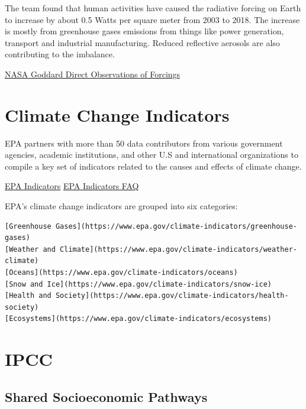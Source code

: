 \documentclass[
]{book}
\begin{document}
The team found that human activities have caused the radiative forcing on Earth to increase by about 0.5 Watts per square meter from 2003 to 2018. The increase is mostly from greenhouse gases emissions from things like power generation, transport and industrial manufacturing. Reduced reflective aerosols are also contributing to the imbalance.

\href{https://www.nasa.gov/feature/goddard/2021/direct-observations-confirm-that-humans-are-throwing-earth-s-energy-budget-off-balance}{NASA Goddard Direct Observations of Forcings}

\hypertarget{climate-change-indicators}{%
\chapter{Climate Change Indicators}\label{climate-change-indicators}}

EPA partners with more than 50 data contributors from various government agencies, academic institutions, and other U.S and international organizations to compile a key set of indicators related to the causes and effects of climate change.

\href{https://www.epa.gov/climate-indicators}{EPA Indicators}
\href{https://www.epa.gov/climate-indicators/frequent-questions-about-climate-change-indicators}{EPA Indicators FAQ}

EPA's climate change indicators are grouped into six categories:

\begin{verbatim}
[Greenhouse Gases](https://www.epa.gov/climate-indicators/greenhouse-gases)
[Weather and Climate](https://www.epa.gov/climate-indicators/weather-climate)
[Oceans](https://www.epa.gov/climate-indicators/oceans)
[Snow and Ice](https://www.epa.gov/climate-indicators/snow-ice)
[Health and Society](https://www.epa.gov/climate-indicators/health-society)
[Ecosystems](https://www.epa.gov/climate-indicators/ecosystems)
\end{verbatim}

\hypertarget{ipcc}{%
\chapter{IPCC}\label{ipcc}}

\hypertarget{shared-socioeconomic-pathways}{%
\section{Shared Socioeconomic Pathways}\label{shared-socioeconomic-pathways}}
\end{document}
